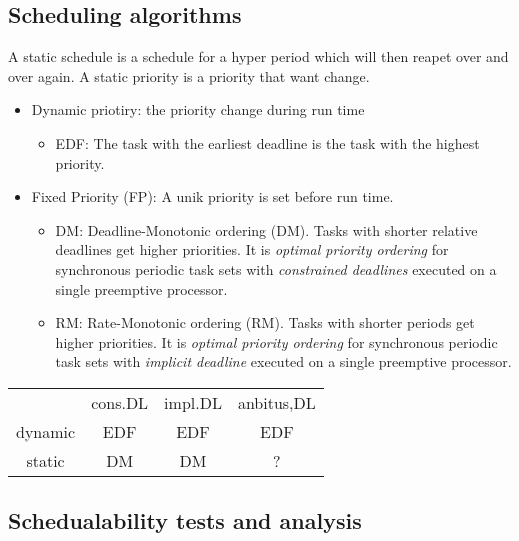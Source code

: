 \subsection{Scheduling algorithms}
A static schedule is a schedule for a hyper period which will then reapet over and over again. A static priority is a priority that want change.
\begin{itemize}
  \item Dynamic priotiry: the priority change during run time
  \begin{itemize}
     \item EDF: The task with the earliest deadline is the task with the highest priority. 
  \end{itemize}
  \item Fixed Priority (FP): A unik priority is set before run time. 
  \begin{itemize}
     \item DM: Deadline-Monotonic ordering (DM). Tasks with shorter relative deadlines get higher priorities. It is \textit{optimal priority ordering} for synchronous periodic task sets with \textit{constrained deadlines} executed on a single preemptive processor.
     \item RM: Rate-Monotonic ordering (RM). Tasks with shorter periods get higher priorities. It is \textit{optimal priority ordering} for synchronous periodic task sets with \textit{implicit deadline} executed on a single preemptive processor.
  \end{itemize}
\end{itemize}

\begin{center}
\begin{tabular}{ |c|c|c|c| } 
 \hline
  & cons.DL & impl.DL & anbitus,DL \\ 
 dynamic & EDF \color{pink}{dbf} & EDF \color{pink}{$U \leq 1$} & EDF \color{pink}{dbf} \\ 
 static & DM & DM & ? \\ 
 \hline
\end{tabular}
\end{center}

   
\subsection{Schedualability tests and analysis}

